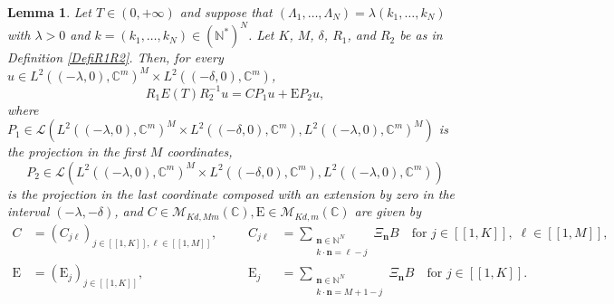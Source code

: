 \documentclass[10pt]{article}
\newcommand{\bn}{\boldsymbol{n}}
\newcommand{\llbracket}{[\![}
\newcommand{\rrbracket}{]\!]}
\theoremstyle{plain}
\newtheorem{lemm}[theo]{Lemma}
\theoremstyle{definition}
\newcommand{\Epsilon}{\mathrm E}
\numberwithin{equation}{section}\numberwithin{figure}{section}\emergencystretch=3em
\begin{document}
\begin{lemm}
\label{LemmMatrixET}
Let $T \in (0, +\infty)$ and suppose that $(\Lambda_1, \dots, \Lambda_N) = \lambda (k_1, \dots, k_N)$ with $\lambda > 0$ and $k = (k_1, \dots, k_N) \in (\mathbb N^\ast)^N$. Let $K$, $M$, $\delta$, $R_1$, and $R_2$ be as in Definition \ref{DefiR1R2}. Then, for every $u \in L^2((-\lambda, 0), \mathbb C^m)^M \times L^2((-\delta, 0), \mathbb C^m)$,\vspace*{-3pt}
\[
R_1 E(T) R_2^{-1} u = C P_1 u + \Epsilon P_2 u,
\]
where $P_1 \in \mathcal L\left(L^2((-\lambda, 0), \mathbb C^m)^M \times L^2((-\delta, 0), \mathbb C^m), L^2((-\lambda, 0), \mathbb C^m)^M\right)$
is the projection in the first $M$ coordinates,\vspace*{-3pt}
\[
P_2 \in \mathcal L\left(L^2((-\lambda, 0), \mathbb C^m)^M \times L^2((-\delta, 0), \mathbb C^m), L^2((-\lambda, 0), \mathbb C^m)\right)
\]
is the projection in the last coordinate composed with an extension by zero in the interval $(-\lambda, -\delta)$, and $C \in \mathcal M_{K d, M m}(\mathbb C), \Epsilon \in \mathcal M_{K d, m}(\mathbb C)$ are given by
\begin{equation}
\label{DefCEps}
\begin{aligned}
C & = \left(C_{j\ell}\right)_{j \in \llbracket 1, K\rrbracket, \ell \in \llbracket 1, M\rrbracket}, & & & C_{j\ell} & = \sum_{\substack{\bn \in \mathbb N^N \\ k \cdot \bn = \ell - j}} \Xi_{\bn} B\quad \text{for } j \in \llbracket 1, K\rrbracket,\; \ell \in \llbracket 1, M\rrbracket, \\
\Epsilon & = \left(\Epsilon_j\right)_{j \in \llbracket 1, K\rrbracket}, & & & \Epsilon_j & = \sum_{\substack{\bn \in \mathbb N^N \\ k \cdot \bn = M+1 - j}} \Xi_{\bn} B \quad\text{for } j \in \llbracket 1, K\rrbracket.
\end{aligned}
\end{equation}
\end{lemm}
\end{document}
